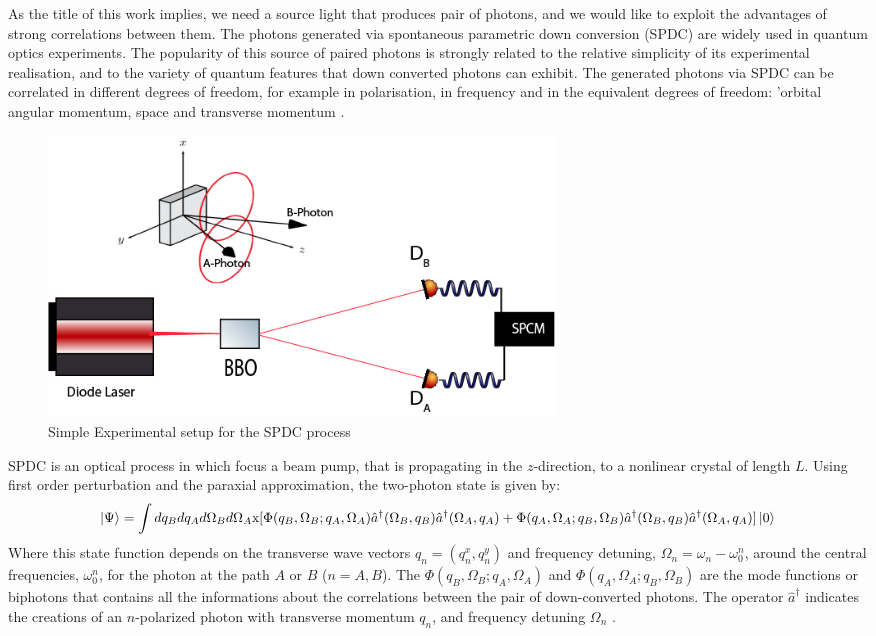 As the title of this work implies, we need a source light that produces pair of photons, 
and we would like to exploit the advantages of strong correlations between them.
The photons generated via spontaneous parametric down conversion (SPDC) are
widely used in quantum optics experiments. The popularity of this source of paired
photons is strongly related to the relative simplicity of its experimental
realisation, and to the variety of quantum features that down converted photons can exhibit. 
The generated photons via SPDC can be correlated in different degrees of freedom, for example 
in polarisation, in frequency and in the equivalent degrees of freedom: 
'orbital angular momentum, space and transverse momentum \cite{spatiocorrelations}.\\

\begin{figure}[h!]
\centering
\label{fig:spdcSimple}
 \includegraphics[width=0.65\textwidth]{Figures/spdcSimple.png}
 \caption{Simple Experimental setup for the SPDC process} 
\end{figure}


SPDC is an optical process in which focus a beam pump, that is 
propagating in the $z$-direction, to a nonlinear crystal of length $L$. Using first order perturbation 
and the paraxial approximation, the two-photon state is given by:
\begin{equation}
\label{eq:stateFunComplex}
\ket{\Psi}=\int dq_B dq_A d\Omega_B d\Omega_A 
\text{x} [\Phi(q_B,\Omega_B;q_A,\Omega_A) \hat{a}^{\dagger} (\Omega_B,q_B) \hat{a}^{\dagger}(\Omega_A,q_A) \\
+ \Phi(q_A,\Omega_A;q_B,\Omega_B) \hat{a}^{\dagger}(\Omega_B,q_B) \hat{a}^{\dagger}(\Omega_A,q_A)]   \ket{0}  
\end{equation}
Where this state function depends on the transverse wave vectors $q_n=(q_n^x,q_n^y)$ and frequency detuning, $\Omega_n=\omega_n-\omega_0^n$, 
around the central frequencies, $\omega_0^n$, for the photon at the path $A$ or $B$ ($n=A,B$).
The $\Phi(q_B,\Omega_B;q_A,\Omega_A)$ and $\Phi(q_A,\Omega_A;q_B,\Omega_B)$
are the mode functions or biphotons that contains all the informations about the correlations
between the pair of down-converted photons. The operator $\hat{a}^{\dagger}$ indicates the creations of an $n$-polarized photon with transverse momentum $q_n$, 
and frequency detuning $\Omega_n$ \cite{physicsGhost}. \\

